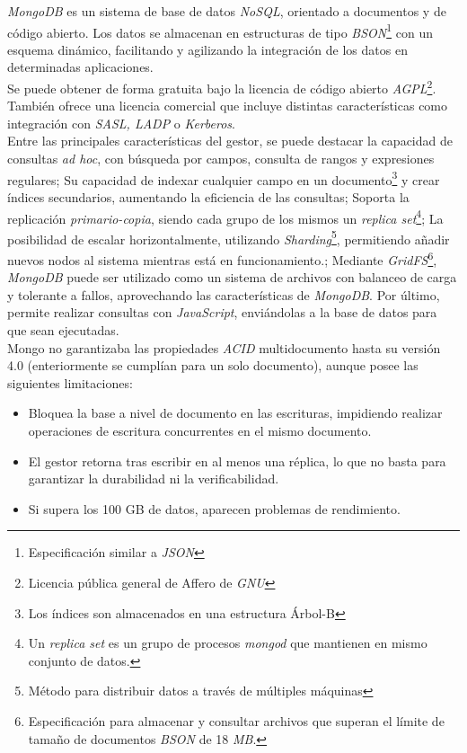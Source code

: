 \documentclass[10pt]{article}
\begin{document}
\emph{MongoDB} es un sistema de base de datos \emph{NoSQL}, orientado a documentos y de código abierto. Los datos se almacenan en estructuras de tipo \emph{BSON}\footnote{Especificación similar a \emph{JSON}} con un esquema dinámico, facilitando y agilizando la integración de los datos en determinadas aplicaciones.\\
Se puede obtener de forma gratuita bajo la licencia de código abierto  \emph{AGPL}\footnote{Licencia pública general de Affero de \emph{GNU}}. También ofrece una licencia comercial que incluye distintas características como integración con \emph{SASL, LADP} o \emph{Kerberos}.\cite{WIKI:13}\\

Entre las principales características del gestor\cite{WIKI:14}, se puede destacar la capacidad de consultas \emph{ad hoc}, con búsqueda por campos, consulta de rangos y expresiones regulares; Su capacidad de indexar cualquier campo en un documento\footnote{Los índices son almacenados en una estructura Árbol-B} y crear índices secundarios, aumentando la eficiencia de las consultas\cite{MDB:1}; Soporta la replicación \emph{primario-copia}, siendo cada grupo de los mismos un \emph{replica set}\footnote{Un \emph{replica set} es un grupo de procesos \emph{mongod} que mantienen en mismo conjunto de datos.\cite{MDB:2}}; La posibilidad de escalar horizontalmente, utilizando \emph{Sharding}\footnote{Método para distribuir datos a través de múltiples máquinas}, permitiendo añadir nuevos nodos al sistema mientras está en funcionamiento.\cite{MDB:3};  Mediante \emph{GridFS}\footnote{Especificación para almacenar y consultar archivos que superan el límite de tamaño de documentos \emph{BSON} de 18 \emph{MB}.\cite{MDB:4}}, \emph{MongoDB} puede ser utilizado como un sistema de archivos con balanceo de carga y tolerante a fallos, aprovechando las características de \emph{MongoDB}. Por último, permite realizar consultas con \emph{JavaScript}\cite{MDB:5}, enviándolas a la base de datos para que sean ejecutadas.\\

Mongo no garantizaba las propiedades \emph{ACID} multidocumento hasta su versión 4.0 (enteriormente se cumplían para un solo documento), aunque posee las siguientes limitaciones\cite{WIKI:15}: 

\begin{itemize}
	\item Bloquea la base a nivel de documento en las escrituras, impidiendo realizar operaciones de escritura concurrentes en el mismo documento. 
	\item El gestor retorna tras escribir en al menos una réplica, lo que no basta para garantizar la durabilidad ni la verificabilidad.\cite{MDB:9}
	\item Si supera los 100 GB de datos, aparecen problemas de rendimiento.\cite{MDB:10}
\end{itemize}
\end{document}
